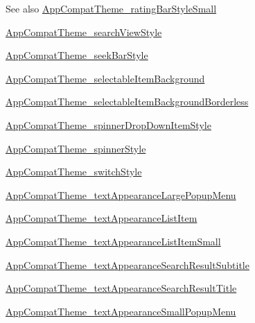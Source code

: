 \begin{DoxySeeAlso}{See also}
\hyperlink{classandroid_1_1support_1_1v4_1_1R_1_1styleable_a82003426a43aa180e41d2b25450047c9}{App\+Compat\+Theme\+\_\+rating\+Bar\+Style\+Small} 

\hyperlink{classandroid_1_1support_1_1v4_1_1R_1_1styleable_ad107185a80adbb1be528d21aa3a5e644}{App\+Compat\+Theme\+\_\+search\+View\+Style} 

\hyperlink{classandroid_1_1support_1_1v4_1_1R_1_1styleable_ac401ab56daa8fcd20c0beb0413d8813f}{App\+Compat\+Theme\+\_\+seek\+Bar\+Style} 

\hyperlink{classandroid_1_1support_1_1v4_1_1R_1_1styleable_a3e75027080282e399085b17ac981b5be}{App\+Compat\+Theme\+\_\+selectable\+Item\+Background} 

\hyperlink{classandroid_1_1support_1_1v4_1_1R_1_1styleable_aabd8d4f3de97874973f63a4e93a5fd9a}{App\+Compat\+Theme\+\_\+selectable\+Item\+Background\+Borderless} 

\hyperlink{classandroid_1_1support_1_1v4_1_1R_1_1styleable_a0aa97271d74700457071ff210723f1c6}{App\+Compat\+Theme\+\_\+spinner\+Drop\+Down\+Item\+Style} 

\hyperlink{classandroid_1_1support_1_1v4_1_1R_1_1styleable_aeba225a2c69936da0d94609f5e139e48}{App\+Compat\+Theme\+\_\+spinner\+Style} 

\hyperlink{classandroid_1_1support_1_1v4_1_1R_1_1styleable_a88c6ebdb5e64556c13f05c1525c8ef99}{App\+Compat\+Theme\+\_\+switch\+Style} 

\hyperlink{classandroid_1_1support_1_1v4_1_1R_1_1styleable_a946d0cdb84dc252db74ba6bd92a139c3}{App\+Compat\+Theme\+\_\+text\+Appearance\+Large\+Popup\+Menu} 

\hyperlink{classandroid_1_1support_1_1v4_1_1R_1_1styleable_afb0912c36e3e09d6a8e93507b65bf499}{App\+Compat\+Theme\+\_\+text\+Appearance\+List\+Item} 

\hyperlink{classandroid_1_1support_1_1v4_1_1R_1_1styleable_a7130801a509563566260e6edc992a049}{App\+Compat\+Theme\+\_\+text\+Appearance\+List\+Item\+Small} 

\hyperlink{classandroid_1_1support_1_1v4_1_1R_1_1styleable_aa2cece194eee07266ff9a9a5dd1bf22b}{App\+Compat\+Theme\+\_\+text\+Appearance\+Search\+Result\+Subtitle} 

\hyperlink{classandroid_1_1support_1_1v4_1_1R_1_1styleable_aa8c47e569f9386614f689cf93446e929}{App\+Compat\+Theme\+\_\+text\+Appearance\+Search\+Result\+Title} 

\hyperlink{classandroid_1_1support_1_1v4_1_1R_1_1styleable_a75e7751d6580449963f139fd3c4efd52}{App\+Compat\+Theme\+\_\+text\+Appearance\+Small\+Popup\+Menu} 


\end{DoxySeeAlso}
